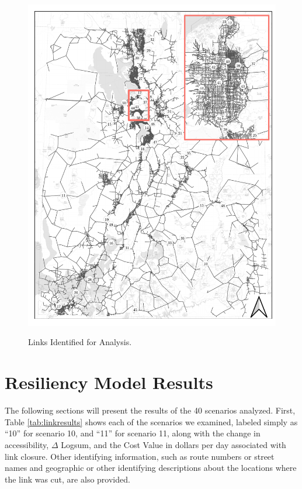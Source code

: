 \begin{figure}

{\centering \includegraphics[width=0.95\linewidth]{figures/chapter4/resiliency_links_map.pdf}}

\caption{Links Identified for Analysis.}
\label{fig:linksmap}
\end{figure}

\section{Resiliency Model Results}

The following sections will present the results of the 40 scenarios analyzed.
First, Table \ref{tab:linkresults} shows each of the scenarios we examined,
labeled simply as ``10'' for scenario 10, and ``11'' for scenario 11, along with the
change in accessibility, $\Delta$ Logsum, and the Cost Value in dollars per day
associated with link closure. Other identifying information, such as route
numbers or street names and geographic or other identifying descriptions about
the locations where the link was cut, are also provided.

